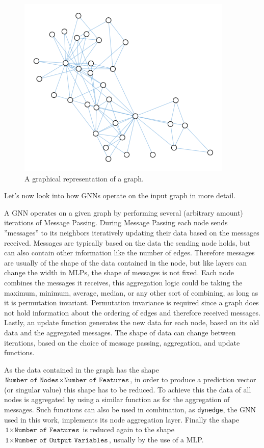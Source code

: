 \documentclass[a4paper,10pt]{scrartcl}
\begin{document}
\begin{figure}[h]
    \includegraphics[scale=0.6]{images/graphneuralnetwork.png}
    \centering
    \caption{A graphical representation of a graph.}
    \label{fig:graphneuralnetwork}
\end{figure}

Let's now look into how GNNs operate on the input graph in more detail.

A GNN operates on a given graph by performing several (arbitrary amount) iterations of Message Passing.
During Message Passing each node sends ''messages'' to its neighbors iteratively updating their data based on the messages received.
Messages are typically based on the data the sending node holds, but can also contain other information like the number of edges.
Therefore messages are usually of the shape of the data contained in the node, but like layers can change the width in MLPs, the shape of messages is not fixed.
Each node combines the messages it receives, this aggregation logic could be taking the maximum, minimum, average, median, or any other sort of combining, as long as it is permutation invariant.
Permutation invariance is required since a graph does not hold information about the ordering of edges and therefore received messages.
Lastly, an update function generates the new data for each node, based on its old data and the aggregated messages.
The shape of data can change between iterations, based on the choice of message passing, aggregation, and update functions.

As the data contained in the graph has the shape $\texttt{Number of Nodes} \times \texttt{Number of Features}$, in order to produce a prediction vector (or singular value) this shape has to be reduced.
To achieve this the data of all nodes is aggregated by using a similar function as for the aggregation of messages.
Such functions can also be used in combination, as \texttt{dynedge}, the GNN used in this work, implements its node aggregation layer.
Finally the shape $\texttt{1} \times \texttt{Number of Features}$ is reduced again to the shape $\texttt{1} \times \texttt{Number of Output Variables}$, usually by the use of a MLP.
\end{document}
